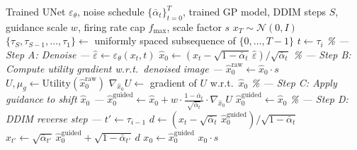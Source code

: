 \documentclass[11pt]{article}
\newcommand{\N}{\mathcal{N}}
\begin{document}
\begin{algorithm}[H]
\caption{Guided Reverse Diffusion for Stimulus Generation}
\label{alg:guided}
\begin{algorithmic}[1]
\Require Trained UNet $\varepsilon_\theta$, noise schedule
  $\{\bar\alpha_t\}_{t=0}^T$, trained GP model,
  DDIM steps $S$, guidance scale $w$, firing rate cap $f_{\max}$,
  scale factor $s$
\State $x_T \sim \N(0, I)$ 
\State $\{\tau_S, \tau_{S-1}, \ldots, \tau_1\} \gets$
  uniformly spaced subsequence of $\{0, \ldots, T{-}1\}$
  \State $t \gets \tau_i$
  \Statex
  \Statex \textit{\% --- Step A: Denoise ---}
  \State $\hat\varepsilon \gets \varepsilon_\theta(x_t, t)$
  \State $\hat x_0 \gets
    (x_t - \sqrt{1 - \bar\alpha_t}\, \hat\varepsilon) / \sqrt{\bar\alpha_t}$
  \Statex
  \Statex \textit{\% --- Step B: Compute utility gradient w.r.t.\ denoised image ---}
  \State $\hat x_0^{\text{raw}} \gets \hat x_0 \cdot s$
  \State $U, \mu_g \gets \text{Utility}(\hat x_0^{\text{raw}})$
  \State $\nabla_{\hat x_0} U \gets$ gradient of $U$ w.r.t.\ $\hat x_0$
  \Statex
  \Statex \textit{\% --- Step C: Apply guidance to shift $\hat x_0$ ---}
    \State $\hat x_0^{\text{guided}} \gets
      \hat x_0 + w \cdot \frac{1 - \bar\alpha_t}{\sqrt{\bar\alpha_t}}
      \cdot \nabla_{\hat x_0} U$
  \Else
    \State $\hat x_0^{\text{guided}} \gets \hat x_0$
  \EndIf
  \Statex
  \Statex \textit{\% --- Step D: DDIM reverse step ---}
    \State $t' \gets \tau_{i-1}$
    \State $d \gets (x_t - \sqrt{\bar\alpha_t}\, \hat x_0^{\text{guided}})
      / \sqrt{1 - \bar\alpha_t}$
    \State $x_{t'} \gets \sqrt{\bar\alpha_{t'}}\, \hat x_0^{\text{guided}}
      + \sqrt{1 - \bar\alpha_{t'}}\, d$
  \Else
    \State $x_0 \gets \hat x_0^{\text{guided}}$
  \EndIf
\EndFor
\State \Return $x_0 \cdot s$ 
\end{algorithmic}
\end{algorithm}
\end{document}
